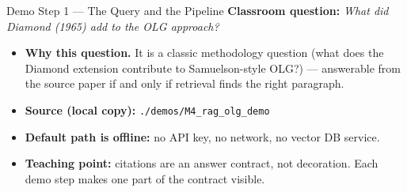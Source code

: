 \begin{frame}{Demo Step 1 --- The Query and the Pipeline}
\textbf{Classroom question:} \emph{What did Diamond (1965) add to the OLG approach?}

\vspace{0.2cm}
\begin{center}
\end{center}

\vspace{0.2cm}
\begin{itemize}
  \item \textbf{Why this question.} It is a classic methodology question (what does the Diamond extension contribute to Samuelson-style OLG?) — answerable from the source paper if and only if retrieval finds the right paragraph.
  \item \textbf{Source (local copy):} \texttt{./demos/M4\_rag\_olg\_demo}
  \item \textbf{Default path is offline:} no API key, no network, no vector DB service.
  \item \textbf{Teaching point:} citations are an answer contract, not decoration. Each demo step makes one part of the contract visible.
\end{itemize}
\end{frame}


